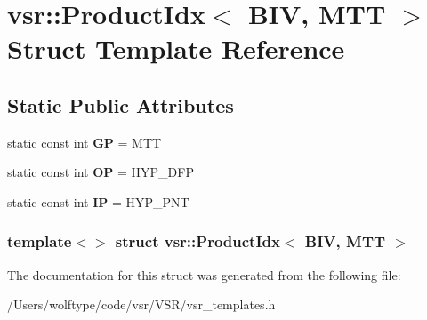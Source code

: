 \hypertarget{structvsr_1_1_product_idx_3_01_b_i_v_00_01_m_t_t_01_4}{\section{vsr\-:\-:Product\-Idx$<$ B\-I\-V, M\-T\-T $>$ Struct Template Reference}
\label{structvsr_1_1_product_idx_3_01_b_i_v_00_01_m_t_t_01_4}
}
\subsection*{Static Public Attributes}
\begin{DoxyCompactItemize}
\item 
\hypertarget{structvsr_1_1_product_idx_3_01_b_i_v_00_01_m_t_t_01_4_a51c74541613db52529aaaa55c42d95be}{static const int {\bfseries G\-P} = M\-T\-T}\label{structvsr_1_1_product_idx_3_01_b_i_v_00_01_m_t_t_01_4_a51c74541613db52529aaaa55c42d95be}

\item 
\hypertarget{structvsr_1_1_product_idx_3_01_b_i_v_00_01_m_t_t_01_4_a142f476ca38987613e7cd849bed14338}{static const int {\bfseries O\-P} = H\-Y\-P\-\_\-\-D\-F\-P}\label{structvsr_1_1_product_idx_3_01_b_i_v_00_01_m_t_t_01_4_a142f476ca38987613e7cd849bed14338}

\item 
\hypertarget{structvsr_1_1_product_idx_3_01_b_i_v_00_01_m_t_t_01_4_af1ef5342fe1f5c2d433067e0747651d7}{static const int {\bfseries I\-P} = H\-Y\-P\-\_\-\-P\-N\-T}\label{structvsr_1_1_product_idx_3_01_b_i_v_00_01_m_t_t_01_4_af1ef5342fe1f5c2d433067e0747651d7}

\end{DoxyCompactItemize}
\subsubsection*{template$<$$>$ struct vsr\-::\-Product\-Idx$<$ B\-I\-V, M\-T\-T $>$}



The documentation for this struct was generated from the following file\-:\begin{DoxyCompactItemize}
\item 
/\-Users/wolftype/code/vsr/\-V\-S\-R/vsr\-\_\-templates.\-h\end{DoxyCompactItemize}
